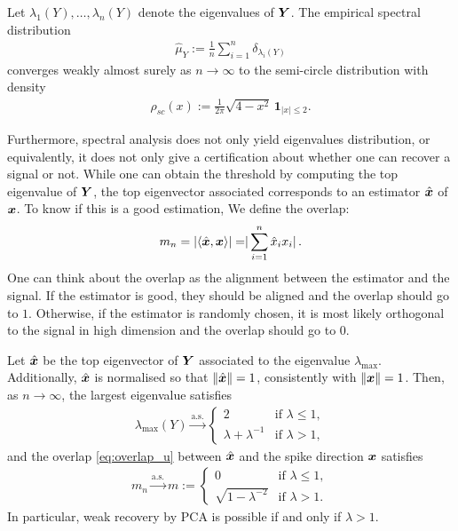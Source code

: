 \documentclass[11pt]{article}
\begin{document}
\begin{theo}\label{thm:semi-circle}
Let $\lambda_1(Y),\dots,\lambda_n(Y)$ denote the eigenvalues of $\bm{Y}$. The empirical spectral distribution
\begin{align}
\hat{\mu}_Y := \frac{1}{n}\sum_{i=1}^n \delta_{\lambda_i(Y)}
\end{align}
converges weakly almost surely as $n \to \infty$ to the semi-circle distribution with density
\begin{align}
    \rho_{sc}(x) := \frac{1}{2\pi}\sqrt{4-x^2}\,\mathbf{1}_{|x|\le 2}.
\end{align}
\end{theo}


\noindent
Furthermore, spectral analysis does not only yield eigenvalues distribution, or equivalently, it does not only give a certification about whether one can recover a signal or not. 
\noindent
While one can obtain the threshold by computing the top eigenvalue of $\bm{Y}$, the top eigenvector associated corresponds to an estimator $\hat {\bm{x}}$ of $\bm{x}$. 
\noindent
To know if this is a good estimation, We define the overlap: 
\begin{equation}
    m_n = \lvert \langle \hat{\bm{x}} 
     , \bm{x}\rangle \rvert = \rvert\sum_{i=1}^n \hat{x}_i x_i \rvert \, .
    \label{eq:overlap_u}
\end{equation}
\noindent
One can think about the overlap as the alignment between the estimator and the signal. If the estimator is good, they should be aligned and the overlap should go to $1$. Otherwise, if the estimator is randomly chosen, it is most likely orthogonal to the signal in high dimension and the overlap should go to $0$.
\medskip 

\begin{theo}\label{thm:bbp}
Let $\hat{\bm{x}}$ be the top eigenvector of $\bm{Y}$ associated to the eigenvalue $\lambda_{\max}$. Additionally, $\hat{\bm{x}}$ is normalised so that $\|\hat{\bm{x}}\| = 1$, consistently with $\|\bm{x}\| = 1$. Then, as $n\to\infty$, the largest eigenvalue satisfies
\begin{align}
\lambda_{\max}(Y)\xrightarrow{\mathrm{a.s.}}
\begin{cases}
2 & \text{if } \lambda \le 1,\\[0.3em]
\lambda+\lambda^{-1} & \text{if } \lambda > 1,
\end{cases}
\end{align}
and the overlap \eqref{eq:overlap_u} between $\hat{\bm{x}}$ and the spike direction $\bm{x}$ satisfies
\begin{align}
    m_n
    \xrightarrow{\mathrm{a.s.}}
    m := \begin{cases}
        0 & \text{if } \lambda \le 1,\\[0.3em]
        \sqrt{1-\lambda^{-2}} & \text{if } \lambda > 1.
    \end{cases}
\end{align}
In particular, weak recovery by PCA is possible if and only if \(\lambda>1\).
\end{theo}
\end{document}
